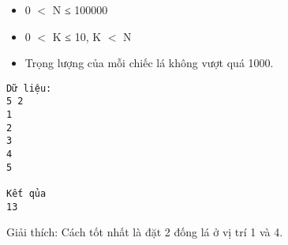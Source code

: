 \begin{itemize}
	\item     0 $<$ N ≤ 100000   
	\item     0 $<$ K ≤ 10, K $<$ N   
	\item     Trọng lượng của mỗi chiếc lá không vượt quá 1000.   
\end{itemize}
\begin{verbatim}
Dữ liệu:
5 2
1
2
3
4
5

Kết qủa
13
\end{verbatim}

   Giải thích: Cách tốt nhất là đặt 2 đống lá ở vị trí 1 và 4.